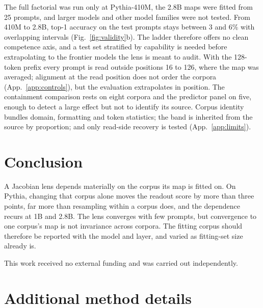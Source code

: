 \documentclass{article}
\begin{document}
The full factorial was run only at Pythia-410M, the 2.8B maps were fitted from 25 prompts, and
larger models and other model families were not tested. From 410M to 2.8B, top-1 accuracy on the test
prompts stays between 3 and $6\%$ with overlapping intervals (Fig.~\ref{fig:validity}b). The ladder
therefore offers no clean competence axis, and a test set stratified by capability is needed before
extrapolating to the frontier models the lens is meant to audit. With the 128-token prefix every
prompt is read outside positions 16 to 126, where the map was averaged; alignment at the read position
does not order the corpora (App.~\ref{app:controls}), but the evaluation extrapolates in position.
The containment comparison rests on eight corpora and the predictor panel on five, enough to detect a
large effect but not to identify its source. Corpus identity bundles domain, formatting and token
statistics; the band is inherited from the source by proportion; and only read-side recovery is
tested (App.~\ref{app:limits}).

\section{Conclusion}

A Jacobian lens depends materially on the corpus its map is fitted on. On Pythia, changing that
corpus alone moves the readout score by more than three points, far more than resampling within a
corpus does, and the dependence recurs at 1B and 2.8B. The lens converges with few prompts, but
convergence to one corpus's map is not invariance across corpora. The fitting corpus should therefore
be reported with the model and layer, and varied as fitting-set size already is.

\newpage
\begin{ack}
This work received no external funding and was carried out independently.
\end{ack}




\newpage
\appendix

\section{Additional method details}
\label{app:method}
\end{document}
